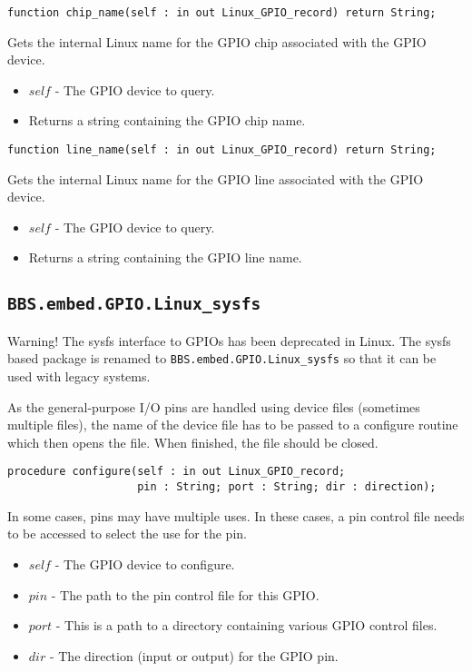 \documentclass[10pt, openany]{book}
\newcommand{\indexfunc}[1]{\index[func]{#1}}
\newcommand{\package}[1]{\texttt{#1}}
\begin{document}
\begin{lstlisting}
function chip_name(self : in out Linux_GPIO_record) return String;
\end{lstlisting}
\indexfunc{chip\_name}
Gets the internal Linux name for the GPIO chip associated with the GPIO device.
\begin{itemize}
  \item $self$ - The GPIO device to query.
  \item Returns a string containing the GPIO chip name.
\end{itemize}

\begin{lstlisting}
function line_name(self : in out Linux_GPIO_record) return String;
\end{lstlisting}
\indexfunc{line\_name}
Gets the internal Linux name for the GPIO line associated with the GPIO device.
\begin{itemize}
  \item $self$ - The GPIO device to query.
  \item Returns a string containing the GPIO line name.
\end{itemize}

\subsection{\package{BBS.embed.GPIO.Linux\_sysfs}}
Warning!  The sysfs interface to GPIOs has been deprecated in Linux.  The sysfs based package is renamed to \package{BBS.embed.GPIO.Linux\_sysfs} so that it can be used with legacy systems.

As the general-purpose I/O pins are handled using device files (sometimes multiple files), the name of the device file has to be passed to a configure routine which then opens the file.  When finished, the file should be closed.

\begin{lstlisting}
procedure configure(self : in out Linux_GPIO_record;
                    pin : String; port : String; dir : direction);
\end{lstlisting}
\indexfunc{configure}
In some cases, pins may have multiple uses.  In these cases, a pin control file needs to be accessed to select the use for the pin.
\begin{itemize}
  \item $self$ - The GPIO device to configure.
  \item $pin$ - The path to the pin control file for this GPIO.
  \item $port$ - This is a path to a directory containing various GPIO control files.
  \item $dir$ - The direction (input or output) for the GPIO pin.
\end{itemize}
\end{document}
